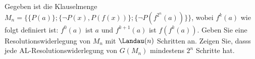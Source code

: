 
\begin{exercise}[186]

Gegeben ist die Klauselmenge $M_n = \{\{P(a)\};\{\neg P(x),P(f(x))\};\{\neg P(f^{2^n}(a))\}\}$,
wobei $f^k(a)$ wie folgt definiert ist: $f^0(a)$ ist $a$ und $f^{k+1}(a)$ ist $f(f^k(a))$.
Geben Sie eine Resolutionswiderlegung von $M_n$ mit $\Landau(n)$ Schritten an.
Zeigen Sie, dasss jede AL-Resolutionswiderlegung von $G(M_n)$ mindestens $2^n$
Schritte hat.

\end{exercise}


\begin{solution}


\end{solution}
